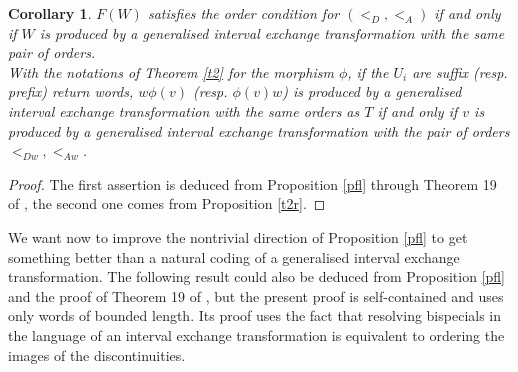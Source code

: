 \documentclass[12pt,a4paper]{amsart}
\newtheorem{corollary}[theorem]{Corollary}
\begin{document}
\begin{center}
\end{center}




\begin{corollary} $F(W)$ satisfies the order condition for  $(<_D,<_A)$ if and only if $W$ is produced by
a generalised interval exchange transformation with the same pair of  orders.\\
With the notations of Theorem \ref{t2} for the morphism $\phi$, if the $U_i$ are suffix (resp. prefix) return words,  $w\phi (v)$ (resp. $\phi (v)w$)  is produced by a generalised  interval exchange transformation with the same orders as $T$ if and only if $v$ is produced by a generalised interval exchange transformation with the pair of orders $<_{Dw},<_{Aw}$.\end{corollary}
\begin{proof} The first assertion is deduced from Proposition \ref{pfl} through Theorem 19 of  \cite{fhuz}, the second one comes from Proposition \ref{t2r}.\end{proof}

 We want now to improve the nontrivial direction of Proposition \ref{pfl}  to get something better than a natural coding of a generalised interval exchange transformation. The following  result could also be deduced from Proposition \ref{pfl} 
and the proof of Theorem 19 of  \cite{fhuz}, but the present proof is self-contained and uses only words of bounded length. Its proof uses the fact that resolving bispecials in the language of an  interval exchange transformation is equivalent to ordering the images of the discontinuities.
\end{document}
